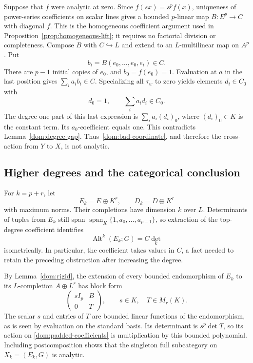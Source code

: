 \documentclass[11pt]{amsart}
\theoremstyle{definition}
\theoremstyle{remark}
\numberwithin{equation}{section}
\newcommand{\Alt}{\operatorname{Alt}}
\newcommand{\spn}{\operatorname{span}}
\theoremstyle{plain}
\theoremstyle{definition}
\theoremstyle{plain}
\begin{document}
Suppose that $f$ were analytic at zero. Since $f(sx)=s^pf(x)$, uniqueness of power-series coefficients
on scalar lines gives a bounded $p$\nobreakdash-linear map $B\colon E^p\to C$ with diagonal $f$.
This is the homogeneous coefficient argument used in Proposition~\ref{prop:homogeneous-lift}; it requires no factorial
division or completeness. Compose $B$ with $C\hookrightarrow L$ and extend to an $L$\nobreakdash-multilinear
map on $A^p$. Put
\[
b_i=B(e_0,\ldots,e_0,e_i)\in C.
\]
There are $p-1$ initial copies of $e_0$, and $b_0=f(e_0)=1$. Evaluation at $a$ in the last position gives
$\sum_i a_i b_i\in C$. Specializing all $\tau_w$ to zero yields elements $d_i\in C_0$ with
\[
d_0=1,\qquad \sum_i a_i d_i\in C_0.
\]
The degree-one part of this last expression is $\sum_i a_i(d_i)_0$, where $(d_i)_0\in K$ is the
constant term. Its $a_0$\nobreakdash-coefficient equals one. This contradicts Lemma~\ref{dom:degree-gap}.
Thus~\eqref{dom:bad-coordinate}, and therefore the cross-action from $Y$ to $X$, is not analytic.

\subsection{Higher degrees and the categorical conclusion}

For $k=p+r$, let
\[
E_k=E\oplus K^r,\qquad D_k=D\oplus K^r
\]
with maximum norms. Their completions have dimension $k$ over $L$. Determinants of tuples from $E_k$
still span $\spn_K\{1,a_0,\ldots,a_{p-1}\}$, so extraction of the top-degree coefficient identifies
\begin{equation}\label{dom:padded-coefficients}
\Alt^k(E_k;G)=C\det_k
\end{equation}
isometrically. In particular, the coefficient takes values in $C$, a fact needed to retain the preceding
obstruction after increasing the degree.

By Lemma~\ref{dom:rigid}, the extension of every bounded endomorphism of $E_k$ to its
$L$\nobreakdash-completion $A\oplus L^r$ has block form
\[
\begin{pmatrix}sI_p&B\\0&T\end{pmatrix},\qquad s\in K,\quad T\in M_r(K).
\]
The scalar $s$ and entries of $T$ are bounded linear functions of the endomorphism, as is seen by
evaluation on the standard basis. Its determinant is $s^p\det T$, so its action on
\eqref{dom:padded-coefficients} is multiplication by this bounded polynomial. Including postcomposition
shows that the singleton full subcategory on $X_k=(E_k,G)$ is analytic.
\end{document}
